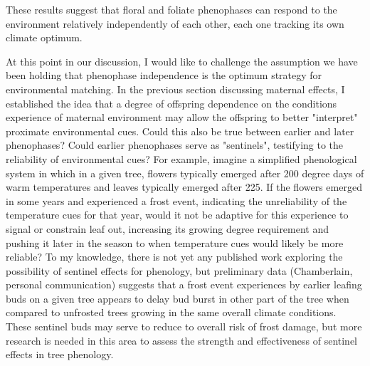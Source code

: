 \documentclass{article}\usepackage[]{graphicx}\usepackage[]{color}
\begin{document}
These results suggest that floral and foliate phenophases can respond to the environment relatively independently of each other, each one tracking its own climate optimum. 
\par At this point in our discussion, I would like to challenge the assumption we have been holding that phenophase independence is the optimum strategy for environmental matching. In the previous section discussing maternal effects, I established the idea that a degree of offspring dependence on the conditions experience of maternal environment may allow the offspring to better "interpret" proximate environmental cues. Could this also be true between earlier and later phenophases? Could earlier phenophases serve as "sentinels", testifying to the reliability of environmental cues? For example, imagine a simplified phenological system in which in a given tree, flowers typically emerged after 200 degree days of warm temperatures and leaves typically emerged after 225. If the flowers emerged in some years and experienced a frost event, indicating the unreliability of the temperature cues for that year,  would it not be adaptive for this experience to signal or constrain leaf out, increasing its growing degree requirement and pushing it later in the season to when temperature cues would likely be more reliable? To my knowledge, there is not yet any published work exploring the possibility of sentinel effects for phenology, but preliminary data (Chamberlain, personal communication) suggests that a frost event experiences by earlier leafing buds on a given tree appears to delay bud burst in other part of the tree when compared to unfrosted trees growing in the same overall climate conditions. These sentinel buds may serve to reduce to overall risk of frost damage, but more research is needed in this area to assess the strength and effectiveness of sentinel effects in tree phenology.
\end{document}
